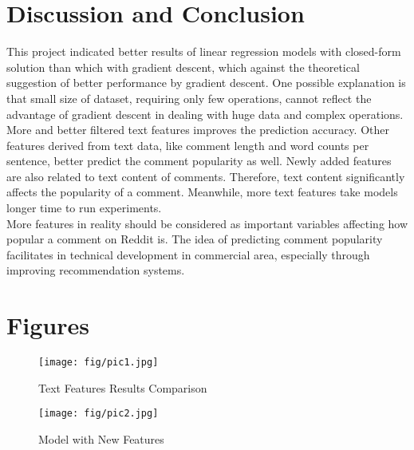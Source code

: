 \documentclass[letterpaper, 12pt]{article}
\begin{document}
\section*{Discussion and Conclusion}

This project indicated better results of linear regression models with closed-form solution than which with gradient descent, which against the theoretical suggestion of better performance by gradient descent. One possible explanation is that small size of dataset, requiring only few operations, cannot reflect the advantage of gradient descent in dealing with huge data and complex operations.\\

More and better filtered text features improves the prediction accuracy. Other features derived from text data, like comment length and word counts per sentence, better predict the comment popularity as well. Newly added features are also related to text content of comments. Therefore, text content significantly affects the popularity of a comment. Meanwhile, more text features take models longer time to run experiments.\\

More features in reality should be considered as important variables affecting how popular a comment on Reddit is. The idea of predicting comment popularity facilitates in technical development in commercial area, especially through improving recommendation systems.

\nocite{*}


\begingroup
    
\endgroup

\section*{Figures}

\begin{figure}[h]
\centering
\texttt{[image: fig/pic1.jpg]}
\caption{Text Features Results Comparison}
\label{fig: fig1}
\end{figure}

\begin{figure}[h]
\centering
\texttt{[image: fig/pic2.jpg]}
\caption{Model with New Features}
\label{fig: fig2}
\end{figure}
\end{document}
